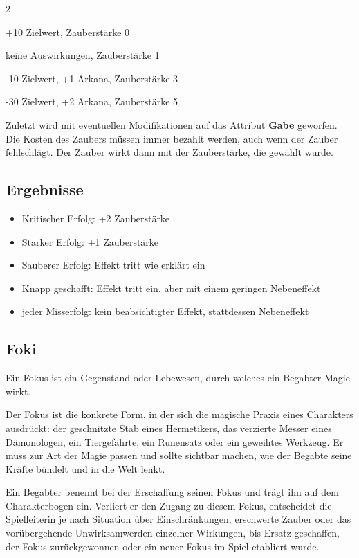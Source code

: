 \begin{multicols*}{2}
\begin{description}[leftmargin=0pt]
\item[\textbf{Gering}] +10 Zielwert, Zauberstärke 0
\item[\textbf{Normal}] keine Auswirkungen, Zauberstärke 1
\item[\textbf{Schwer}] -10 Zielwert, +1 Arkana, Zauberstärke 3
\item[\textbf{Katastrophal}] -30 Zielwert, +2 Arkana, Zauberstärke 5
\end{description}

Zuletzt wird mit eventuellen Modifikationen auf das Attribut \textbf{Gabe} geworfen.
Die Kosten des Zaubers müssen immer bezahlt werden, auch wenn der Zauber fehlschlägt.
Der Zauber wirkt dann mit der Zauberstärke, die gewählt wurde.

\subsection{Ergebnisse}\label{subsec:ergebnisse}
\begin{itemize}[leftmargin=*]
    \item Kritischer Erfolg: +2 Zauberstärke
    \item Starker Erfolg: +1 Zauberstärke
    \item Sauberer Erfolg: Effekt tritt wie erklärt ein
    \item Knapp geschafft: Effekt tritt ein, aber mit einem geringen Nebeneffekt
    \item jeder Misserfolg: kein beabsichtigter Effekt, stattdessen Nebeneffekt
\end{itemize}

\subsection{Foki}\label{subsec:fokus}

Ein Fokus ist ein Gegenstand oder Lebewesen, durch welches ein Begabter Magie wirkt.

Der Fokus ist die konkrete Form, in der sich die magische Praxis eines Charakters ausdrückt: der geschnitzte Stab eines Hermetikers, das verzierte Messer eines Dämonologen, ein Tiergefährte, ein Runensatz oder ein geweihtes Werkzeug. Er muss zur Art der Magie passen und sollte sichtbar machen, wie der Begabte seine Kräfte bündelt und in die Welt lenkt.

Ein Begabter benennt bei der Erschaffung seinen Fokus und trägt ihn auf dem Charakterbogen ein. Verliert er den Zugang zu diesem Fokus, entscheidet die Spielleiterin je nach Situation über Einschränkungen, erschwerte Zauber oder das vorübergehende Unwirksamwerden einzelner Wirkungen, bis Ersatz geschaffen, der Fokus zurückgewonnen oder ein neuer Fokus im Spiel etabliert wurde.


\end{multicols*}
